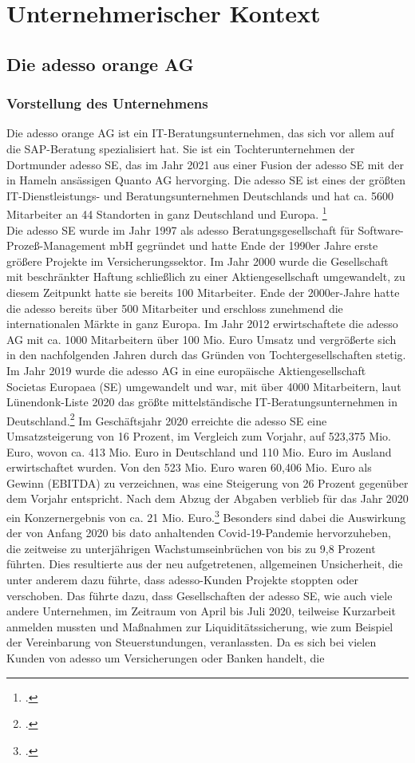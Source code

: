 \section{Unternehmerischer Kontext}
\subsection{Die adesso orange AG}
\subsubsection{Vorstellung des Unternehmens}
Die adesso orange AG ist ein IT-Beratungsunternehmen, das sich vor allem auf die SAP-Beratung spezialisiert hat. Sie ist ein Tochterunternehmen der Dortmunder adesso SE, das im Jahr 2021 aus einer Fusion der adesso SE mit der in Hameln ansässigen Quanto AG hervorging. Die adesso SE ist eines der größten IT-Dienstleistungs- und Beratungsunternehmen Deutschlands und hat ca. 5600 Mitarbeiter an 44 Standorten in ganz Deutschland und Europa. \footcite[Vgl.][]{adesso-main} \\Die adesso SE wurde im Jahr 1997 als \glqq{}adesso Beratungsgesellschaft für Software-Prozeß-Management mbH\grqq{} gegründet und hatte Ende der 1990er Jahre erste größere Projekte im Versicherungssektor. Im Jahr 2000 wurde die Gesellschaft mit beschränkter Haftung schließlich zu einer Aktiengesellschaft umgewandelt, zu diesem Zeitpunkt hatte sie bereits 100 Mitarbeiter. Ende der 2000er-Jahre hatte die adesso bereits über 500 Mitarbeiter und erschloss zunehmend die internationalen Märkte in ganz Europa. Im Jahr 2012 erwirtschaftete die adesso AG mit ca. 1000 Mitarbeitern über 100 Mio. Euro Umsatz und vergrößerte sich in den nachfolgenden Jahren durch das Gründen von Tochtergesellschaften stetig. Im Jahr 2019 wurde die adesso AG in eine europäische Aktiengesellschaft \glqq{}Societas Europaea\grqq{} (SE) umgewandelt und war, mit über 4000 Mitarbeitern, laut \glqq{}Lünendonk-Liste 2020\grqq{} das größte mittelständische IT-Beratungsunternehmen in Deutschland.\footcite[Vgl.][]{adesso-historie} Im Geschäftsjahr 2020 erreichte die adesso SE eine Umsatzsteigerung von 16 Prozent, im Vergleich zum Vorjahr, auf 523,375 Mio. Euro, wovon ca. 413 Mio. Euro in Deutschland und 110 Mio. Euro im Ausland erwirtschaftet wurden. Von den 523 Mio. Euro waren 60,406 Mio. Euro als Gewinn (EBITDA) zu verzeichnen, was eine Steigerung von 26 Prozent gegenüber dem Vorjahr entspricht. Nach dem Abzug der Abgaben verblieb für das Jahr 2020 ein Konzernergebnis von ca. 21 Mio. Euro.\footcite[Vgl.][S. 4]{adesso2020-report} Besonders sind dabei die Auswirkung der von Anfang 2020 bis dato anhaltenden Covid-19-Pandemie hervorzuheben, die zeitweise zu unterjährigen Wachstumseinbrüchen von bis zu 9,8 Prozent führten. Dies resultierte aus der neu aufgetretenen, allgemeinen Unsicherheit, die unter anderem dazu führte, dass adesso-Kunden Projekte stoppten oder verschoben. Das führte dazu, dass Gesellschaften der adesso SE, wie auch viele andere Unternehmen, im Zeitraum von April bis Juli 2020, teilweise Kurzarbeit anmelden mussten und Maßnahmen zur Liquiditätssicherung, wie zum Beispiel der Vereinbarung von Steuerstundungen, veranlassten. Da es sich bei vielen Kunden von adesso um Versicherungen oder Banken handelt, die 